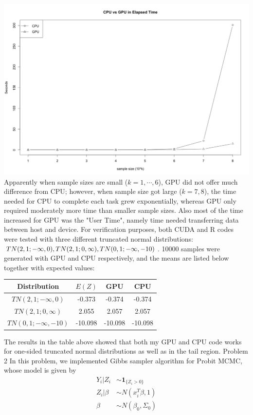 \documentclass[12pt]{article}
\begin{document}
\includegraphics[width=\textwidth]{cpuvsgpuet.png}\newline
Apparently when sample sizes are small ($k = 1, \cdots, 6$), GPU did not offer much difference from CPU; however, when sample size got large ($k = 7, 8$), the time needed for CPU to complete each task grew exponentially, whereas GPU only required moderately more time than smaller sample sizes. Also most of the time increased for GPU was the "User Time", namely time needed transferring data between host and device.\newline
For verification purposes, both CUDA and R codes were tested with three different truncated normal distributions: $TN(2, 1; -\infty, 0), TN(2, 1; 0, \infty), \newline TN(0, 1; -\infty, -10)$. 10000 samples were generated with GPU and CPU respectively, and the means are listed below together with expected values:
\begin{center}
	\begin{tabular}{|c|c|c|c|}
	\hline
	Distribution & $E(Z)$ & GPU & CPU \\
	\hline
	$TN(2, 1; -\infty, 0)$ & -0.373 & -0.374 & -0.374 \\
	\hline
	$TN(2, 1; 0, \infty)$ & 2.055 & 2.057 & 2.057 \\
	\hline
	$TN(0, 1; -\infty, -10)$ & -10.098 & -10.098 & -10.098 \\
	\hline	
	\end{tabular}
\end{center}
The results in the table above showed that both my GPU and CPU code works for one-sided truncated normal distributions as well as in the tail region.
\newline \newline
Problem 2 \newline \newline
In this problem, we implemented Gibbs sampler algorithm for Probit MCMC, whose model is given by
\begin{align*}
	Y_i|Z_i &\sim \mathbf{1}_{\{Z_i > 0\}} \\
	Z_i | \beta &\sim N(x^T_i\beta, 1) \\
	\beta &\sim N(\beta_0, \Sigma_0)
\end{align*}
\end{document}
